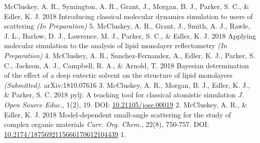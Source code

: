 \begin{cvpubys}
  \cvpuby
    {McCluskey, A. R., Symington, A. R., Grant, J., Morgan, B. J., Parker, S. C., \& Edler, K. J.}
    {2018}
    {Introducing classical molecular dynamics simulation to users of scattering}
    {\emph{(In Preparation)}}
    {5.}
  \cvpuby
    {McCluskey, A. R., Grant, J., Smith, A. J., Rawle, J. L., Barlow, D. J., Lawrence, M. J., Parker, S. C., \& Edler, K. J.}
    {2018}
    {Applying molecular simulation to the analysis of lipid monolayer reflectometry}
    {\emph{(In Preparation)}}
    {4.}
  \cvpuby
  	{McCluskey, A. R., Sanchez-Fernandez, A., Edler, K. J., Parker, S. C., Jackson, A. J., Campbell, R. A., \& Arnold, T.}
    {2018}
    {Bayesian determination of the effect of a deep eutectic solvent on the structure of lipid monolayers}
    {\emph{(Submitted)}. arXiv:1810.07616}
    {3.}
  \cvpuby
  	{McCluskey, A. R., Morgan, B. J., Edler, K. J., \& Parker, S. C.}
  	{2018}
  	{pylj: A teaching tool for classical atomistic simulation}
  	{\emph{J. Open Source Educ.}, 1(2), 19. DOI: \href{http://doi.org/10.21105/jose.00019}{10.21105/jose.00019}}
  	{2.}
  \cvpuby
    {McCluskey, A. R., \& Edler, K. J.}
    {2018}
    {Model-dependent small-angle scattering for the study of complex organic materials}
	  {\emph{Curr. Org. Chem.}, 22(8), 750-757. DOI: \href{http://doi.org/10.2174/1875692115666170612104439}{10.2174/1875692115666170612104439}}
    {1.}
\end{cvpubys}
